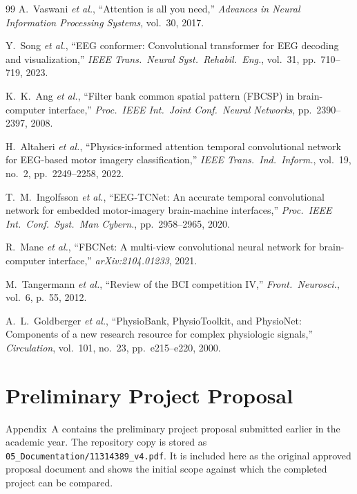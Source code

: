 \documentclass[12pt, a4paper]{article}
\begin{document}
\begin{thebibliography}{99}
A.~Vaswani \emph{et al.}, ``Attention is all you need,'' \textit{Advances in Neural Information Processing Systems}, vol.~30, 2017.

Y.~Song \emph{et al.}, ``EEG conformer: Convolutional transformer for EEG decoding and visualization,'' \textit{IEEE Trans.\ Neural Syst.\ Rehabil.\ Eng.}, vol.~31, pp.~710--719, 2023.

K.~K.~Ang \emph{et al.}, ``Filter bank common spatial pattern (FBCSP) in brain-computer interface,'' \textit{Proc.\ IEEE Int.\ Joint Conf.\ Neural Networks}, pp.~2390--2397, 2008.

H.~Altaheri \emph{et al.}, ``Physics-informed attention temporal convolutional network for EEG-based motor imagery classification,'' \textit{IEEE Trans.\ Ind.\ Inform.}, vol.~19, no.~2, pp.~2249--2258, 2022.

T.~M.~Ingolfsson \emph{et al.}, ``EEG-TCNet: An accurate temporal convolutional network for embedded motor-imagery brain-machine interfaces,'' \textit{Proc.\ IEEE Int.\ Conf.\ Syst.\ Man Cybern.}, pp.~2958--2965, 2020.

R.~Mane \emph{et al.}, ``FBCNet: A multi-view convolutional neural network for brain-computer interface,'' \textit{arXiv:2104.01233}, 2021.

M.~Tangermann \emph{et al.}, ``Review of the BCI competition IV,'' \textit{Front.\ Neurosci.}, vol.~6, p.~55, 2012.

A.~L.~Goldberger \emph{et al.}, ``PhysioBank, PhysioToolkit, and PhysioNet: Components of a new research resource for complex physiologic signals,'' \textit{Circulation}, vol.~101, no.~23, pp.~e215--e220, 2000.
\end{thebibliography}

\clearpage
\appendix

\section{Preliminary Project Proposal}

Appendix~A contains the preliminary project proposal submitted earlier in the academic year. The repository copy is stored as \texttt{05\_Documentation/11314389\_v4.pdf}. It is included here as the original approved proposal document and shows the initial scope against which the completed project can be compared.
\end{document}
